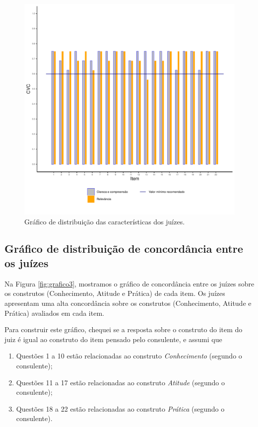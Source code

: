 \documentclass[
]{article}
\providecommand{\tightlist}{%
  \setlength{\itemsep}{0pt}\setlength{\parskip}{0pt}}
\begin{document}
\begin{figure}[htbp]

{\centering \includegraphics[width=0.9\linewidth]{figures/grafico2_80_perc} 

}

\caption{Gráfico de distribuição das características dos juízes.}\label{fig:grafico2V2}
\end{figure}

\newpage

\hypertarget{gruxe1fico-de-distribuiuxe7uxe3o-de-concorduxe2ncia-entre-os-juuxedzes}{%
\subsection{Gráfico de distribuição de concordância entre os juízes}\label{gruxe1fico-de-distribuiuxe7uxe3o-de-concorduxe2ncia-entre-os-juuxedzes}}

Na Figura \ref{fig:grafico3}, mostramos o gráfico de concordância entre os juízes sobre os construtos (Conhecimento, Atitude e Prática) de cada item. Os juízes apresentam uma alta concordância sobre os construtos (Conhecimento, Atitude e Prática) avaliados em cada item.

Para construir este gráfico, chequei se a resposta sobre o construto do item do juiz é igual ao construto do item pensado pelo consulente, e assumi que

\begin{enumerate}
\def\labelenumi{\arabic{enumi}.}
\tightlist
\item
  Questões 1 a 10 estão relacionadas ao construto \emph{Conhecimento} (segundo o consulente);
\item
  Questões 11 a 17 estão relacionadas ao construto \emph{Atitude} (segundo o consulente);
\item
  Questões 18 a 22 estão relacionadas ao construto \emph{Prática} (segundo o consulente).
\end{enumerate}
\end{document}
